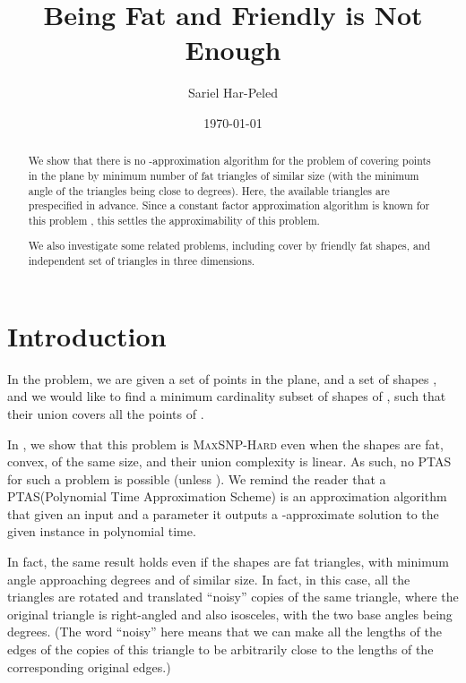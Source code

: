 \documentclass[12pt]{article}
\providecommand{\ComplexityClass}[1]{{{\textcolor[named]{\si{OliveGreen}}{\textsc{#1}}}}}
\providecommand{\MaxSNPHard}{{\ComplexityClass{Max{S}NP-Hard}}\xspace}
\providecommand{\PTAS}{\textsf{\si{PTAS}}\xspace}
\begin{document}
\title{Being Fat and Friendly is Not Enough}


\author{Sariel Har-Peled\SarielThanks{}}

\date{\today}

\maketitle

\begin{abstract}
    We show that there is no -approximation algorithm for
    the problem of covering points in the plane by minimum number of
    fat triangles of similar size (with the minimum angle of the
    triangles being close to  degrees). Here, the available
    triangles are prespecified in advance. Since a constant factor
    approximation algorithm is known for this problem
    \cite{cv-iaags-07}, this settles the approximability of this
    problem.

    We also investigate some related problems, including cover by
    friendly fat shapes, and independent set of triangles in three
    dimensions.
\end{abstract}

\section{Introduction}


In the  problem, we are given a set 
of points in the plane, and a set of shapes , and we would
like to find a minimum cardinality subset of shapes of , such
that their union covers all the points of .

In , we show that this problem is \MaxSNPHard even when
the shapes are fat, convex, of the same size, and their union
complexity is linear. As such, no \PTAS for such a problem is possible
(unless ). We remind the reader that a \PTAS (Polynomial
Time Approximation Scheme) is an approximation algorithm that given an
input and a parameter  it outputs a -approximate
solution to the given instance in polynomial time.

In fact, the same result holds even if the shapes are fat triangles,
with minimum angle approaching  degrees and of similar size. In
fact, in this case, all the triangles are rotated and translated
``noisy'' copies of the same triangle, where the original triangle is
right-angled and also isosceles, with the two base angles being 
degrees. (The word ``noisy'' here means that we can make all the
lengths of the edges of the copies of this triangle to be arbitrarily
close to the lengths of the corresponding original edges.)
    
\end{document}
